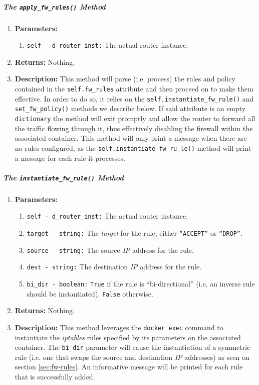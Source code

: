         \subparagraph{The \texttt{apply\_fw\_rules()} Method}
            \begin{enumerate}
                \item \textbf{Parameters:}
                \begin{enumerate}
                    \item \texttt{self - d\_router\_inst:} The actual router instance.
                \end{enumerate}
                \item \textbf{Returns:} Nothing.
                \item \textbf{Description:} This method will parse (i.e. process) the rules and policy contained in the \texttt{self.fw\_rules} attribute and then proceed on to make them effective. In order to do so, it relies on the \texttt{self.instantiate\_fw\_rule()} and \texttt{set\_fw\_policy()} methods we describe below. If said attribute is an empty \texttt{dictionary} the method will exit promptly and allow the router to forward all the traffic flowing through it, thus effectively disabling the firewall within the associated container. This method will only print a message when there are no rules configured, as the \texttt{self.instantiate\_fw\_ru le()} method will print a message for each rule it processes.
            \end{enumerate}

        \subparagraph{The \texttt{instantiate\_fw\_rule()} Method}
            \begin{enumerate}
                \item \textbf{Parameters:}
                \begin{enumerate}
                    \item \texttt{self - d\_router\_inst:} The actual router instance.
                    \item \texttt{target - string:} The \textit{target} for the rule, either \texttt{``ACCEPT''} or \texttt{``DROP''}.
                    \item \texttt{source - string:} The source \textit{IP} address for the rule.
                    \item \texttt{dest - string:} The destination \textit{IP} address for the rule.
                    \item \texttt{bi\_dir - boolean:} \texttt{True} if the rule is ``bi-directional'' (i.e. an inverse rule should be instantiated). \texttt{False} otherwise.
                \end{enumerate}
                \item \textbf{Returns:} Nothing.
                \item \textbf{Description:} This method leverages the \texttt{docker exec} command to instantiate the \textit{iptables} rules specified by its parameters on the associated container. The \texttt{bi\_dir} parameter will cause the instantiation of a symmetric rule (i.e. one that swaps the source and destination \textit{IP} addresses) as seen on section \ref{sec:fw-rules}. An informative message will be printed for each rule that is successfully added.
            \end{enumerate}

